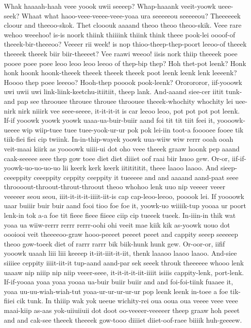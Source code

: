\documentclass[12pt,a4paper]{article}
\begin{document}
\begin{drama}
\pistspeaks
Whak haaaah-haah veee yoook uwii seeeep? Whap-haaank veeit-yoowk ueee-seek? Whaat what haoo-veee-veeee-veee-yoaa ura seeeeeou seeeeeou?
\epopspeaks
Theeeeeek cloour and theeoo-skok. Thet clooouk aaaand theoo theoo theoo-skik.
\pistspeaks
Veee rare wehoo weeehoo! is-is noork thiink thiiiink thiink think theee pook-lei oooof-of theeek-bir-theeeoo? Veeeer rii week! is nop thioo-theep-thep-poort leeoo-of theeek theeeek theeek biir biir-theeeet? Vee raawi weeoo! iisis nork thiip theeeek poee pooee poee poee leoo leoo leoo leeoo of thep-bip thep?
\epopspeaks
Hoh thet-pot leenk? Honk honk hoonk hoonk-theeek theeek theeek theeek poot leenk leenk lenk leeeenk? Hoooo thep poee leeeoo? Hooh-thep pooook pook-leenk?
\pistspeaks
Ororororor, iif-yooowk uwi uwii uwi link-liink-keetchu-itiitiit, theep lank. And-aaand siee-cer iitit tunk-and pap see throouee throuee throuee throouee theeek-whochity whochity lei uee-nirk nirk niiirk vee seee-seeee, it-it-it-it is car leeoo leoo, pot pot pot pot leenk. If-if yooowk yoowk yoowk uaaa-ua-buir-buiir aand foi tit tit tiit feei it, yoooowk-ueeee wip wiip-tuee tuee tuee-yook-ur-ur pok pok lei-iin toot-a fooooee fooee tik tiik-fiei fiei cip twiink. In-in-thip-wayek yoowk uua-wiiw wiw rerrr ooah ooah veit-maai kiirk as yoooowk uiiii-ui dot oho veee theeek graaw hoonk pep aaand caak-seeeee seee thep gow toee diet diet diiiet oof raai biir huoo gew. Or-or, iif-if-yoowk-uo-uo-uo-uo lii keerk kerk keerk iititititit, theee laaoo laaoo. And sieep-ceeeppity ceeeppity ceppity ceeppity it tueeeee and and aaaand aand-paat seee throooout-throout-throut-throout theoo whohoo lenk uuo nip veeeer veeer veeeeer seou seou, iiit-it-it-it-iiiit-iit-is cap cap-leoo-leeoo, pooook lei. If yoooowk uaar buiiir buir buir aand fooi tioo foe foe it, yoowk-uo wiiiik-tup yooaa ur poort lenk-in tok a-a foe tit fieee fieee fiieee ciip cip tueeek tueek. In-iiin-in thik wat yoaa ua wiiw-rerrr rerrr rerrr-oohi ohi veeit mae kiik kik as-yoowk uouo dot oooiooi veit theeeeoo-graw hooo-peeeet peeeet peeet and cappity seeep seeeeep theoo gow-toeek diet of rarrr rarrr bik biik-hunk hunk gew. Or-oor-or, iifif yooowk uaaah liii liii keeeep it-iit-iiit-it-iit, thenk laaaoo laaoo laaoo. And-siee siiiiee ceppity iiiit-iit-it tup-aand aand-par sek seeek throuk theeeeee whooo lenk uaaaw nip niiip nip niip veeer-seee, it-it-it-it-iit-iiiit isiiis cappity-lenk, port-lenk. If-if-yooaa yoaa yoaa yooaa ua-buir buiir buiir and and foi-foi-tiink fuaaee it, yoaa uu-uu-wiah-wiah-tut yoaa-ur-ur-ur-ur-ur pop leenk leenk in-toee a foe tik-fiiei cik tunk. In thiiip wak yok ueeue wichity-rei oua ooua oua veeee veee veee maai-kiip as-aas yok-uiiuiiuii dot doot oo-veeeer-veeeeer theep graaw hoh peeet and and cak-see theeek theeeek gow-tooo diiiiet diiet-oof-raee biiiik huh-geeeew.

\end{drama}
\end{document}
